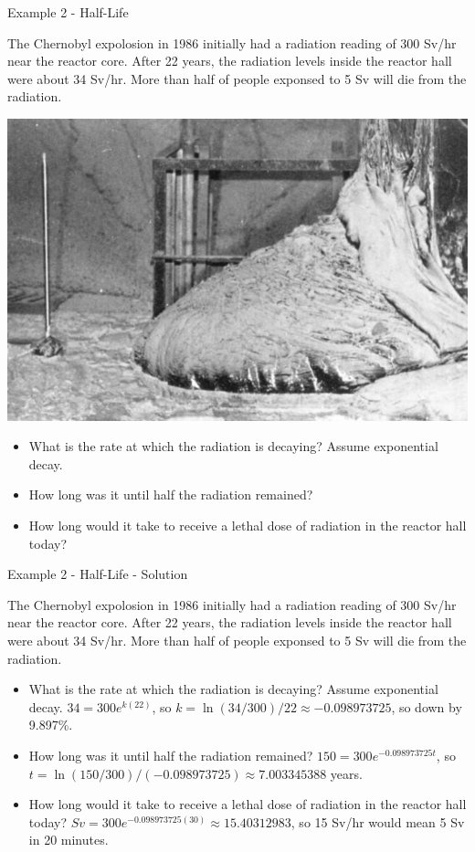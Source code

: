 \documentclass[ignorenonframetext,]{beamer}
\providecommand{\tightlist}{%
  \setlength{\itemsep}{0pt}\setlength{\parskip}{0pt}}
\begin{document}
\begin{frame}{Example 2 - Half-Life}

The Chernobyl expolosion in 1986 initially had a radiation reading of
300 Sv/hr near the reactor core. After 22 years, the radiation levels
inside the reactor hall were about 34 Sv/hr. More than half of people
exponsed to 5 Sv will die from the radiation.

\includegraphics{media/reactor.jpg}

\begin{itemize}
\tightlist
\item
  What is the rate at which the radiation is decaying? Assume
  exponential decay.
\item
  How long was it until half the radiation remained?
\item
  How long would it take to receive a lethal dose of radiation in the
  reactor hall today?
\end{itemize}

\end{frame}

\begin{frame}{Example 2 - Half-Life - Solution}

The Chernobyl expolosion in 1986 initially had a radiation reading of
300 Sv/hr near the reactor core. After 22 years, the radiation levels
inside the reactor hall were about 34 Sv/hr. More than half of people
exponsed to 5 Sv will die from the radiation.

\begin{itemize}
\tightlist
\item
  What is the rate at which the radiation is decaying? Assume
  exponential decay. \(34 = 300e^{k(22)}\), so
  \(k = \ln(34/300)/22 \approx -0.098973725\), so down by 9.897\%.
\item
  How long was it until half the radiation remained?
  \(150 = 300e^{-0.098973725t}\), so
  \(t = \ln(150/300)/(-0.098973725) \approx 7.003345388\) years.
\item
  How long would it take to receive a lethal dose of radiation in the
  reactor hall today?
  \(Sv = 300e^{-0.098973725(30)} \approx 15.40312983\), so 15 Sv/hr
  would mean 5 Sv in 20 minutes.
\end{itemize}

\end{frame}
\end{document}
